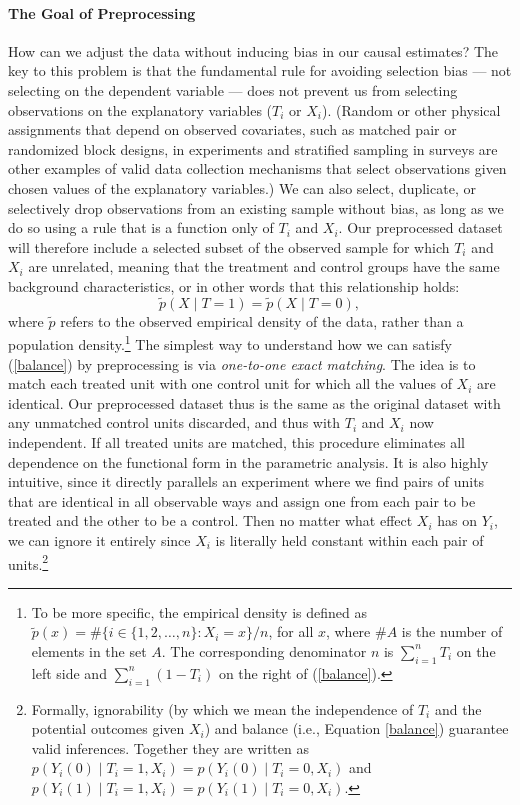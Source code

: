 \documentclass[11pt,titlepage]{article}
\begin{document}
\paragraph{The Goal of Preprocessing}
How can we adjust the data without inducing bias in our causal
estimates?  The key to this problem is that the fundamental rule for
avoiding selection bias --- not selecting on the dependent variable
--- does not prevent us from selecting observations on the explanatory
variables ($T_i$ or $X_i$).  (Random or other physical assignments
that depend on observed covariates, such as matched pair or randomized
block designs, in experiments and stratified sampling in surveys are
other examples of valid data collection mechanisms that select
observations given chosen values of the explanatory variables.)  We
can also select, duplicate, or selectively drop observations from an
existing sample without bias, as long as we do so using a rule that is
a function only of $T_i$ and $X_i$.  Our preprocessed dataset will
therefore include a selected subset of the observed sample for which
$T_i$ and $X_i$ are unrelated, meaning that the treatment and control
groups have the same background characteristics, or in other words
that this relationship holds:
\begin{equation}
  \label{balance}
  \tilde p(X\mid T=1) = \tilde p(X\mid T=0),
\end{equation}
where $\tilde p$ refers to the observed empirical density of the data,
rather than a population density.\footnote{To be more specific, the
  empirical density is defined as $\tilde p(x) = \# \{ i\in \{1, 2,
  \dots, n \}: X_i = x \} / n$, for all $x$, where $\#A$ is the number
  of elements in the set $A$.  The corresponding denominator $n$ is
  $\sum_{i=1}^n T_i$ on the left side and $\sum_{i=1}^n (1-T_i)$ on
  the right of (\ref{balance}).}  The simplest way to understand how
we can satisfy (\ref{balance}) by preprocessing is via
\emph{one-to-one exact matching}.  The idea is to match each treated
unit with one control unit for which all the values of $X_i$ are
identical.  Our preprocessed dataset thus is the same as the original
dataset with any unmatched control units discarded, and thus with
$T_i$ and $X_i$ now independent.  If all treated units are matched,
this procedure eliminates all dependence on the functional form in the
parametric analysis.  It is also highly intuitive, since it directly
parallels an experiment where we find pairs of units that are
identical in all observable ways and assign one from each pair to be
treated and the other to be a control.  Then no matter what effect
$X_i$ has on $Y_i$, we can ignore it entirely since $X_i$ is literally
held constant within each pair of units.\footnote{Formally,
  ignorability (by which we mean the independence of $T_i$ and the
  potential outcomes given $X_i$) and balance (i.e., Equation
  \ref{balance}) guarantee valid inferences.  Together they are
  written as $p(Y_i(0)\mid T_i=1,X_i)=p(Y_i(0)\mid T_i=0,X_i)$ and
  $p(Y_i(1)\mid T_i=1,X_i)=p(Y_i(1)\mid T_i=0,X_i)$.}
\end{document}

